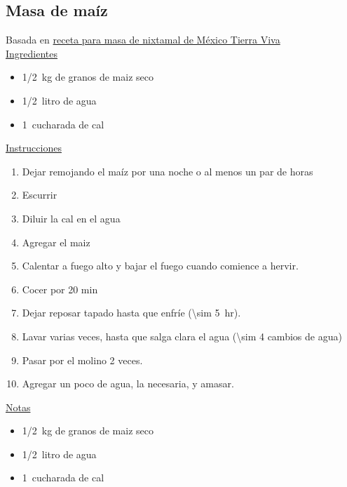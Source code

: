 \subsection{Masa de maíz}

Basada en \href{https://mexicotierraviva.org/con-maiz-masa-de-nixtamal/}{receta para masa de nixtamal de México Tierra Viva}\\

\underline{Ingredientes}
\begin{itemize}
\item \SI{1/2}{kg} de granos de maiz seco
\item \SI{1/2}{litro} de agua
\item \SI{1}{cucharada} de cal
\end{itemize}

\underline{Instrucciones}
\begin{enumerate}
\item Dejar remojando el maíz por una noche o al menos un par de horas
\item Escurrir
\item Diluir la cal en el agua
\item Agregar el maiz
\item Calentar a fuego alto y bajar el fuego cuando comience a hervir.
\item Cocer por 20 min
\item Dejar reposar tapado hasta que enfríe (\SI{\sim 5}{hr}).
\item Lavar varias veces, hasta que salga clara el agua (\num{\sim 4} cambios de agua)
\item Pasar por el molino 2 veces.
\item Agregar un poco de agua, la necesaria, y amasar.
\end{enumerate}

\underline{Notas}
\begin{itemize}
\item \SI{1/2}{kg} de granos de maiz seco
\item \SI{1/2}{litro} de agua
\item \SI{1}{cucharada} de cal
\end{itemize}